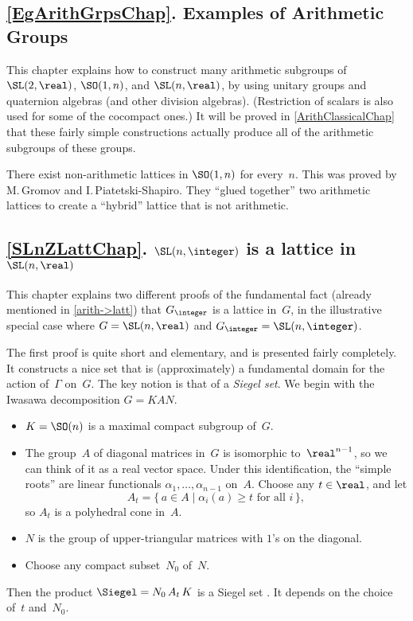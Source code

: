 \subsection*{\cref{EgArithGrpsChap}. Examples of Arithmetic Groups} 
This chapter explains how to construct many arithmetic subgroups of $\SL(2,\real)$, %
$\SO(1,n)$, %
and $\SL(n,\real)$,
by using unitary groups and quaternion algebras (and other division algebras). (Restriction of scalars is also used for some of the cocompact ones.) It will be proved in \cref{ArithClassicalChap} that these fairly simple constructions actually produce all of the arithmetic subgroups of these groups.

 There exist non-arithmetic lattices in $\SO(1,n)$ for every~$n$. This was proved by M.\,Gromov and I.\,Piatetski-Shapiro. They ``glued together'' two arithmetic lattices to create a ``hybrid'' lattice that is not arithmetic.








\subsection*{\cref{SLnZLattChap}. $\SL(n,\integer)$ is a lattice in $\SL(n,\real)$} 
This chapter explains two different proofs of the fundamental fact (already mentioned in \cref{arith->latt}) that $G_\integer$ is a lattice in~$G$, in the illustrative special case where $G = \SL(n,\real)$ and $G_\integer = \SL(n,\integer)$.

\smallbreak

The first proof is quite short and elementary, and is presented fairly completely. It constructs a nice set that is (approximately) a fundamental domain for the action of~$\Gamma$ on~$G$.
The key notion is that of a \emph{Siegel set}.  We begin with the Iwasawa decomposition $G = KAN$.%
\noprelistbreak
	\begin{itemize}
	\item $K = \SO(n)$ is a maximal compact subgroup of~$G$.
	\item The group~$A$ of diagonal matrices in~$G$ is isomorphic to~$\real^{n-1}$, so we can think of it as a real vector space. Under this identification, the ``simple roots'' are linear functionals $\alpha_1, \ldots,\alpha_{n-1}$ on~$A$. Choose any $t \in \real$, and let
		$$ A_t = \{\, a \in A \mid \text{$\alpha_i(a) \ge t$ for all~$i$} \,\} ,$$
	so $A_t$ is a polyhedral cone in~$A$.
	
	\item $N$ is the group of upper-triangular matrices with $1$'s on the diagonal.
	\item Choose any compact subset~$N_0$ of~$N$.
	\end{itemize}
Then the product $\Siegel = N_0 \, A_t \,K$ is a Siegel set . It depends on the choice of~$t$ and~$N_0$.

